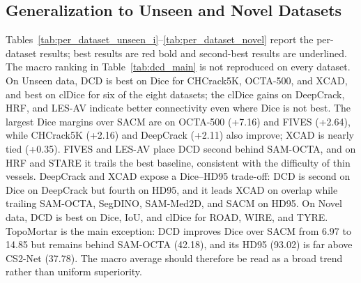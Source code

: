 \subsection{Generalization to Unseen and Novel Datasets}
\label{sec:per_dataset}

Tables~\ref{tab:per_dataset_unseen_i}--\ref{tab:per_dataset_novel} report the
per-dataset results; best results are red bold and second-best results are
underlined.  The macro ranking in Table~\ref{tab:dcd_main} is not reproduced
on every dataset.  On Unseen data, DCD is best on Dice for CHCrack5K,
OCTA-500, and XCAD, and best on clDice for six of the eight datasets; the
clDice gains on DeepCrack, HRF, and LES-AV indicate better connectivity even
where Dice is not best.  The largest Dice margins over SACM are on OCTA-500
(+7.16) and FIVES (+2.64), while CHCrack5K (+2.16) and DeepCrack (+2.11)
also improve; XCAD is nearly tied (+0.35).  FIVES and LES-AV place DCD second
behind SAM-OCTA, and on HRF and STARE it trails the best baseline,
consistent with the difficulty of thin vessels.  DeepCrack and XCAD expose a
Dice--HD95 trade-off: DCD is second on Dice on DeepCrack but fourth on HD95,
and it leads XCAD on overlap while trailing SAM-OCTA, SegDINO, SAM-Med2D, and
SACM on HD95.  On Novel data, DCD is best on Dice, IoU, and clDice for ROAD, WIRE,
and TYRE.  TopoMortar is the main exception: DCD improves Dice over SACM
from 6.97 to 14.85 but remains behind SAM-OCTA (42.18), and its HD95 (93.02)
is far above CS2-Net (37.78).  The macro average should therefore be read as
a broad trend rather than uniform superiority.

\setcounter{dbltopnumber}{4}
\renewcommand{\dbltopfraction}{1.0}
\renewcommand{\arraystretch}{0.85}
\setlength{\textfloatsep}{8pt plus 2pt minus 2pt}
\setlength{\floatsep}{6pt plus 1pt minus 1pt}
\setlength{\dblfloatsep}{4pt plus 1pt minus 1pt}
\setlength{\dbltextfloatsep}{4pt plus 1pt minus 1pt}

